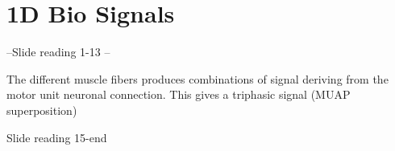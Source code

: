 \chapter{1D Bio Signals}
--Slide reading 1-13 --

The different muscle fibers produces combinations of signal deriving from the motor unit neuronal connection. This gives a triphasic signal (MUAP superposition)

Slide reading 15-end

